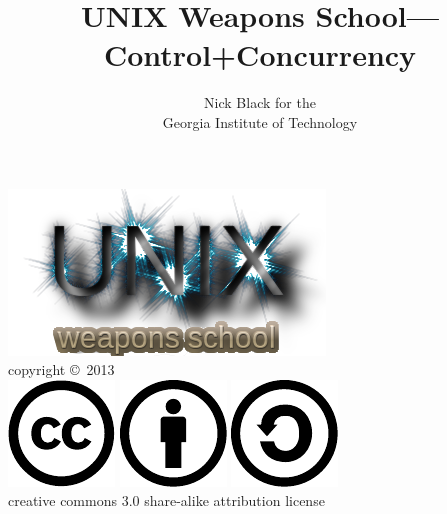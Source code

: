 \documentclass[xcolor={dvipsnames,table}]{beamer}
\title{UNIX Weapons School---Control+Concurrency}
\date{}
\author{Nick Black for the\\
Georgia Institute of Technology
}
\begin{document}
\begin{frame}
\titlepage
\begin{center}
\includegraphics[scale=0.33]{images/uws.png}\\
\vspace{.1in}
\tiny{copyright \copyright\ 2013}\\
\includegraphics[scale=.25]{images/cc-logo.pdf}
\includegraphics[scale=.25]{images/cc-new.pdf}
\includegraphics[scale=.25]{images/cc-share.pdf}\\
\tiny{creative commons 3.0 share-alike attribution license}
\end{center}
\end{frame}
\end{document}
